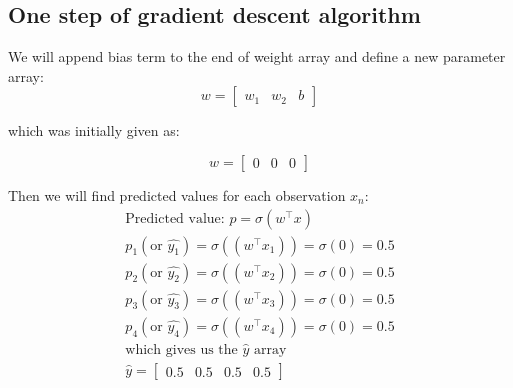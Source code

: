 \documentclass{article}
\begin{document}
\subsection{One step of gradient descent algorithm}
We will append bias term to the end of weight array and define a new parameter array:
\begin{equation}
    w = 
    \begin{bmatrix}
        w_1 & w_2 & b
    \end{bmatrix}
\end{equation}

which was initially given as: 

\begin{equation}
    w = 
    \begin{bmatrix}
        0 & 0 & 0
    \end{bmatrix}
\end{equation}

Then we will find predicted values for each observation $x_n$:
\begin{equation}
    \begin{gathered}
        \text{Predicted value: } p = \sigma (w^\intercal x)\\
        p_1 (\text {or $\hat{y_1}$}) = \sigma ((w^\intercal x_1)) = \sigma (0) = 0.5 \\
        p_2 (\text {or $\hat{y_2}$}) = \sigma ((w^\intercal x_2)) = \sigma (0) = 0.5 \\
        p_3 (\text {or $\hat{y_3}$}) = \sigma ((w^\intercal x_3)) = \sigma (0) = 0.5 \\
        p_4 (\text {or $\hat{y_4}$}) = \sigma ((w^\intercal x_4)) = \sigma (0) = 0.5\\
        \allowbreak
        \text{which gives us the $\hat{y}$ array}\\
        \hat{y} = 
                \begin{bmatrix}
                    0.5 & 0.5 & 0.5 & 0.5
                \end{bmatrix}
    \end{gathered}
\end{equation}
\end{document}
